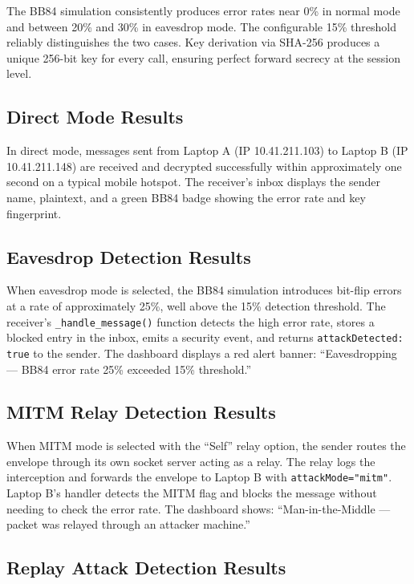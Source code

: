 The BB84 simulation consistently produces error rates near 0\% in normal mode and between 20\% and 30\% in eavesdrop mode. The configurable 15\% threshold reliably distinguishes the two cases. Key derivation via SHA-256 produces a unique 256-bit key for every call, ensuring perfect forward secrecy at the session level.

\subsection{Direct Mode Results}

In direct mode, messages sent from Laptop A (IP 10.41.211.103) to Laptop B (IP 10.41.211.148) are received and decrypted successfully within approximately one second on a typical mobile hotspot. The receiver's inbox displays the sender name, plaintext, and a green BB84 badge showing the error rate and key fingerprint.

\subsection{Eavesdrop Detection Results}

When eavesdrop mode is selected, the BB84 simulation introduces bit-flip errors at a rate of approximately 25\%, well above the 15\% detection threshold. The receiver's \texttt{\_handle\_message()} function detects the high error rate, stores a blocked entry in the inbox, emits a security event, and returns \texttt{attackDetected: true} to the sender. The dashboard displays a red alert banner: ``Eavesdropping --- BB84 error rate 25\% exceeded 15\% threshold.''

\subsection{MITM Relay Detection Results}

When MITM mode is selected with the ``Self'' relay option, the sender routes the envelope through its own socket server acting as a relay. The relay logs the interception and forwards the envelope to Laptop B with \texttt{attackMode="mitm"}. Laptop B's handler detects the MITM flag and blocks the message without needing to check the error rate. The dashboard shows: ``Man-in-the-Middle --- packet was relayed through an attacker machine.''

\subsection{Replay Attack Detection Results}

